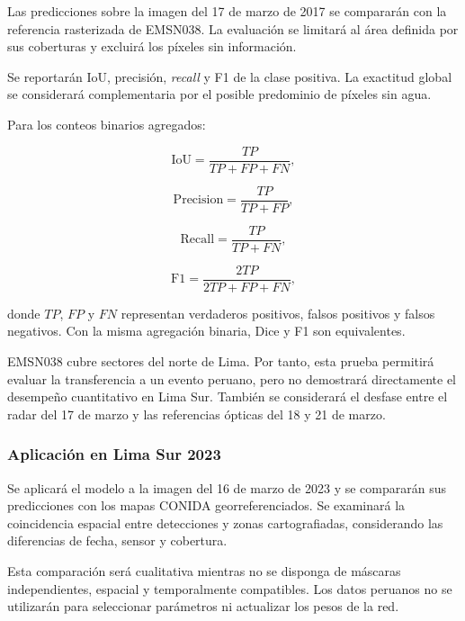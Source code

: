 \documentclass[conference]{IEEEtran}
\begin{document}
Las predicciones sobre la imagen del
17 de marzo de 2017 se compararán con
la referencia rasterizada de EMSN038.
La evaluación se limitará al área definida
por sus coberturas y excluirá los píxeles
sin información.

Se reportarán IoU, precisión, \textit{recall}
y F1  de la clase positiva.
La exactitud global se considerará complementaria
por el posible predominio de píxeles sin agua.

Para los conteos binarios agregados:

\begin{equation}
\mathrm{IoU} =
\frac{TP}{TP+FP+FN},
\end{equation}

\begin{equation}
\mathrm{Precision} =
\frac{TP}{TP+FP},
\end{equation}

\begin{equation}
\mathrm{Recall} =
\frac{TP}{TP+FN},
\end{equation}

\begin{equation}
\mathrm{F1} =
\frac{2TP}{2TP+FP+FN},
\end{equation}

donde $TP$, $FP$ y $FN$ representan verdaderos
positivos, falsos positivos y falsos negativos.
Con la misma agregación binaria, Dice y F1
son equivalentes.

EMSN038 cubre sectores del norte de Lima.
Por tanto, esta prueba permitirá evaluar
la transferencia a un evento peruano,
pero no demostrará directamente el desempeño
cuantitativo en Lima Sur. También se considerará
el desfase entre el radar del 17 de marzo
y las referencias ópticas del 18 y 21 de marzo.

\subsubsection{Aplicación en Lima Sur 2023}

Se aplicará el modelo a la imagen del
16 de marzo de 2023 y se compararán sus
predicciones con los mapas CONIDA
georreferenciados. Se examinará la coincidencia
espacial entre detecciones y zonas cartografiadas,
considerando las diferencias de fecha,
sensor y cobertura.

Esta comparación será cualitativa mientras
no se disponga de máscaras independientes,
espacial y temporalmente compatibles.
Los datos peruanos no se utilizarán
para seleccionar parámetros ni actualizar
los pesos de la red.
\end{document}
